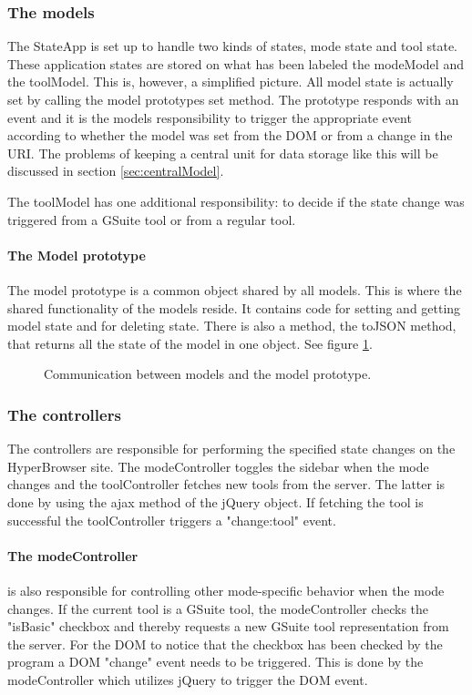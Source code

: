 \documentclass[english]{ifimaster}
\begin{document}
\subsubsection{The models}
The StateApp is set up to handle two kinds of states, mode state and tool state. These application states are stored on what has been labeled the modeModel and the toolModel. This is, however, a simplified picture. All model state is actually set by calling the model prototypes set method. The prototype responds with an event and it is the models responsibility to trigger the appropriate event according to whether the model was set from the DOM or from a change in the URI. The problems of keeping a central unit for data storage like this will be discussed in section \ref{sec:centralModel}.



The toolModel has one additional responsibility: to decide if the state change was triggered from a GSuite tool or from a regular tool. 

\paragraph{The Model prototype}
The model prototype is a common object shared by all models. This is where the shared functionality of the models reside. It contains code for setting and getting model state and for deleting state. There is also a method, the toJSON method, that returns all the state of the model in one object. See figure \ref{fig:prototype}.
\begin{figure}
\centering

\caption{Communication between models and the model prototype.} \label{fig:prototype}

\end{figure}

\subsubsection{The controllers}
The controllers are responsible for performing the specified state changes on the HyperBrowser site. The modeController toggles the sidebar when the mode changes and the toolController fetches new tools from the server. The latter is done by using the ajax method of the jQuery object. If fetching the tool is successful the toolController triggers a "change:tool" event.

\paragraph{The modeController} is also responsible for controlling other mode-specific behavior when the mode changes. If the current tool is a GSuite tool, the modeController checks the "isBasic" checkbox and thereby requests a new GSuite tool representation from the server. For the DOM to notice that the checkbox has been checked by the program a DOM "change" event needs to be triggered. This is done by the modeController which utilizes jQuery to trigger the DOM event. 
\end{document}
